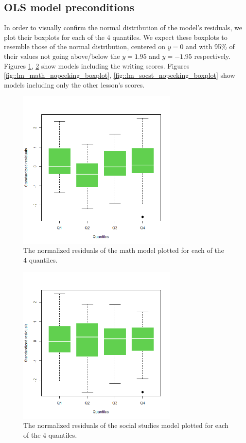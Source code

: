 \documentclass[10pt, a4paper]{article}
\begin{document}
	
	\subsection{OLS model preconditions}
	
	In order to visually confirm the normal distribution of the model's residuals, we plot their boxplots for each of the 4 quantiles. We expect these boxplots to resemble those of the normal distribution, centered on $y=0$ and with 95\% of their values not going above/below the $y=1.95$ and $y=-1.95$ respectively. Figures \ref{fig::lm_math_boxplot}, \ref{fig::lm_socst_boxplot} show models including the writing scores. Figures \ref{fig::lm_math_nopeeking_boxplot}, \ref{fig::lm_socst_nopeeking_boxplot} show models including only the other lesson's scores.
	
	\begin{figure}
		\includegraphics[width=8cm]{lm_math_residual_boxplot.png}
		\centering
		\caption{The normalized residuals of the math model plotted for each of the 4 quantiles.}
		\label{fig::lm_math_boxplot}
	\end{figure}

	\begin{figure}
		\includegraphics[width=8cm]{lm_socst_residual_boxplot.png}
		\centering
		\caption{The normalized residuals of the social studies model plotted for each of the 4 quantiles. }
		\label{fig::lm_socst_boxplot}
	\end{figure}
\end{document}

